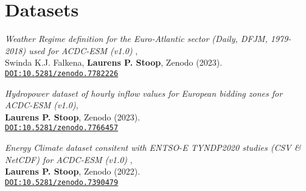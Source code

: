 \section*{Datasets}
\begin{etaremune}{\small

\item \textit{Weather Regime definition for the Euro-Atlantic sector (Daily, DFJM, 1979-2018) used for ACDC-ESM (v1.0) }, \\
Swinda K.J. Falkena, \textbf{Laurens P. Stoop}\ts{\Letter}, Zenodo (2023). \\
\texttt{\href{https://doi.org/10.5281/zenodo.7782226}{DOI:10.5281/zenodo.7782226}}

\item \textit{Hydropower dataset of hourly inflow values for European bidding zones for ACDC-ESM (v1.0)}, \\
\textbf{Laurens P. Stoop}\ts{\Letter}, Zenodo (2023). \\
\texttt{\href{https://doi.org/10.5281/zenodo.7766457}{DOI:10.5281/zenodo.7766457}}

\item \textit{Energy Climate dataset consitent with ENTSO-E TYNDP2020 studies (CSV \& NetCDF) for ACDC-ESM (v1.0) }, \\
\textbf{Laurens P. Stoop}\ts{\Letter}, Zenodo (2022). \\
\texttt{\href{https://doi.org/10.5281/zenodo.7390479}{DOI:10.5281/zenodo.7390479}}

}\end{etaremune}
